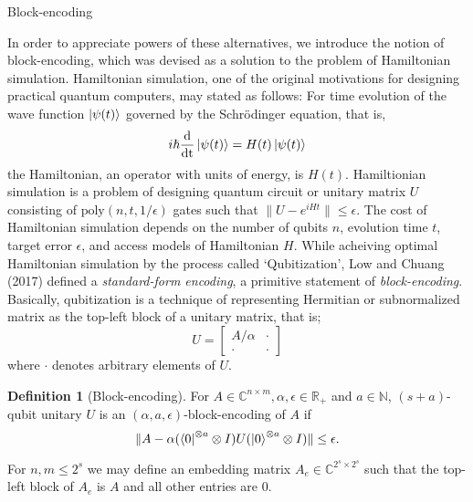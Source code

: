 \documentclass[10pt,twoside,reqno]{amsart} %
\makeatletter
\renewcommand{\section}{\@startsection{section}{1}
   \z@{.7\linespacing\@plus\linespacing}{.5\linespacing}
   {\normalfont\upshape\bfseries\centering}}
\theoremstyle{plain}
\theoremstyle{definition}
\newtheorem{defn}[thm]{Definition}
\makeatother
\begin{document}
\section{Block-encoding}

In order to appreciate powers of these alternatives, we introduce the notion
of block-encoding, which was devised as a solution to the problem of
Hamiltonian simulation. Hamiltonian simulation, one of the original motivations
for designing practical quantum computers, may stated as follows: For time
evolution of the wave function $\ket{\psi(t)}$ governed by the Schr{\"o}dinger
equation, that is,
\[
  i\hslash\frac{\textrm{d}}{\textrm{dt}}\ket{\psi(t)}
  = H(t)\ket{\psi(t)}
\]
the Hamiltonian, an operator with units of energy, is $H(t)$. Hamiltionian
simulation is a problem of designing quantum circuit or unitary matrix $U$
consisting of $\textrm{poly}(n,t,1/\epsilon)$ gates such that $\|U-{e^{iHt}}\|\leq
\epsilon$. %
The cost of Hamiltonian simulation depends on the number of qubits
$n$, evolution time $t$, target error $\epsilon$, and access models of
Hamiltonian $H$. While acheiving optimal Hamiltonian simulation by the
process called `Qubitization', Low and Chuang (2017) defined a \emph{standard-form
encoding}, a primitive statement of \emph{block-encoding}. Basically, 
qubitization is a technique of representing Hermitian or subnormalized matrix
as the top-left block of a unitary matrix, that is;
\[
  U=\begin{bmatrix}A/\alpha &\cdot \\ \cdot &\cdot \end{bmatrix}
\]
where $\cdot$ denotes arbitrary elements of $U$. 
\begin{defn}[Block-encoding] For $A\in\mathbb{C}^{n\times m}, \alpha,\epsilon
  \in\mathbb{R}_{+}$ and $a\in\mathbb{N}$, $(s+a)$-qubit unitary $U$ is an
  $(\alpha,a,\epsilon)$-block-encoding of $A$ if
  \[
    \|A-\alpha(\bra0^{\otimes a}\otimes I)U(\ket0^{\otimes a}\otimes I)\|\leq
    \epsilon.
  \]
\end{defn}
For $n,m\leq 2^s$ we may define an embedding matrix $A_e\in
\mathbb{C}^{2^s\times 2^s}$ such that the top-left block of $A_e$ is $A$ and
all other entries are $0$.
\end{document}
